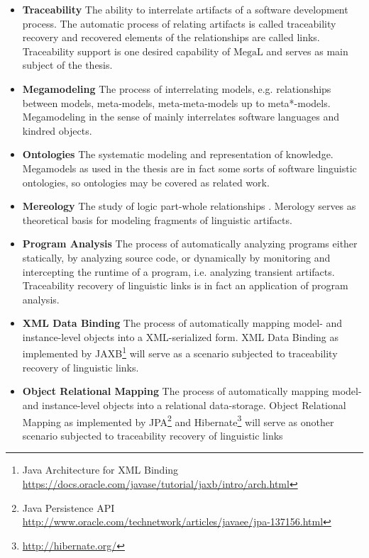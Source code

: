 \documentclass[runningheads,a4paper]{llncs}
\newcommand{\footnoteurl}[1]{\footnote{\url{#1}}}
\newcommand{\megal}{\text{MegaL}}
\begin{document}
\begin{itemize}

\item
\textbf{Traceability}
The ability to interrelate artifacts of a software development process.
The automatic process of relating artifacts is called traceability recovery and recovered elements of the relationships are called links.
Traceability support is one desired capability of $\megal$ and serves as main subject of the thesis.

\item
\textbf{Megamodeling}
The process of interrelating models, e.g. relationships between models, meta-models, meta-meta-models up to meta*-models.
Megamodeling in the sense of \megal mainly interrelates software languages and kindred objects.

\item
\textbf{Ontologies}
The systematic modeling and representation of knowledge.
Megamodels as used in the thesis are in fact some sorts of software linguistic ontologies, so ontologies may be covered as related work.

\item
\textbf{Mereology}
The study of logic part-whole relationships \cite{DBLP:journals/dke/Varzi96}.
Merology serves as theoretical basis for modeling fragments of linguistic artifacts.

\item
\textbf{Program Analysis}
The process of automatically analyzing programs either statically, by analyzing source code, or dynamically by monitoring and intercepting the runtime of a program, i.e. analyzing transient artifacts.
Traceability recovery of linguistic links is in fact an application of program analysis.

\item 
\textbf{XML Data Binding}
The process of automatically mapping model- and instance-level objects into a XML-serialized form.
XML Data Binding as  implemented by JAXB\footnote{Java Architecture for XML Binding \url{https://docs.oracle.com/javase/tutorial/jaxb/intro/arch.html}} will serve as a scenario subjected to traceability recovery of linguistic links.

\item
\textbf{Object Relational Mapping}
The process of automatically mapping model- and instance-level objects into a relational data-storage.
Object Relational Mapping as implemented by JPA\footnote{Java Persistence API \url{http://www.oracle.com/technetwork/articles/javaee/jpa-137156.html}} and Hibernate\footnoteurl{http://hibernate.org/} will serve as onother scenario subjected to traceability recovery of linguistic links

\end{itemize}
\end{document}
